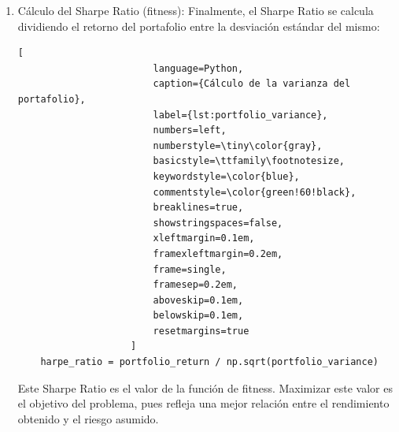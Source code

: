 \documentclass[9pt,a4paper,twoside]{rho-class/rho}
\begin{document}
\begin{enumerate}
                    \begin{lstlisting}[
                        language=Python,
                        caption={Cálculo de la varianza del portafolio},
                        label={lst:portfolio_variance},
                        numbers=left,
                        numberstyle=\tiny\color{gray},
                        basicstyle=\ttfamily\footnotesize,
                        keywordstyle=\color{blue},
                        commentstyle=\color{green!60!black},
                        breaklines=true,
                        showstringspaces=false,
                        xleftmargin=0.1em,
                        framexleftmargin=0.2em,
                        frame=single,
                        framesep=0.2em,
                        aboveskip=0.1em,
                        belowskip=0.1em,
                        resetmargins=true
                    ]
    portfolio_variance = np.dot(weights, np.dot(cov_matrix, weights))
                    \end{lstlisting}
                    La varianza es una medida del riesgo total del portafolio. La raíz cuadrada de esta varianza nos da la desviación estándar del portafolio, que representa el riesgo asumido al invertir en esta combinación de activos.
                
                \item Cálculo del Sharpe Ratio (fitness): Finalmente, el Sharpe Ratio se calcula dividiendo el retorno del portafolio entre la desviación estándar del mismo:        
                    \begin{lstlisting}[
                        language=Python,
                        caption={Cálculo de la varianza del portafolio},
                        label={lst:portfolio_variance},
                        numbers=left,
                        numberstyle=\tiny\color{gray},
                        basicstyle=\ttfamily\footnotesize,
                        keywordstyle=\color{blue},
                        commentstyle=\color{green!60!black},
                        breaklines=true,
                        showstringspaces=false,
                        xleftmargin=0.1em,
                        framexleftmargin=0.2em,
                        frame=single,
                        framesep=0.2em,
                        aboveskip=0.1em,
                        belowskip=0.1em,
                        resetmargins=true
                    ]
    harpe_ratio = portfolio_return / np.sqrt(portfolio_variance)
                    \end{lstlisting}
                    Este Sharpe Ratio es el valor de la función de fitness. Maximizar este valor es el objetivo del problema, pues refleja una mejor relación entre el rendimiento obtenido y el riesgo asumido.
            \end{enumerate}
\end{document}
